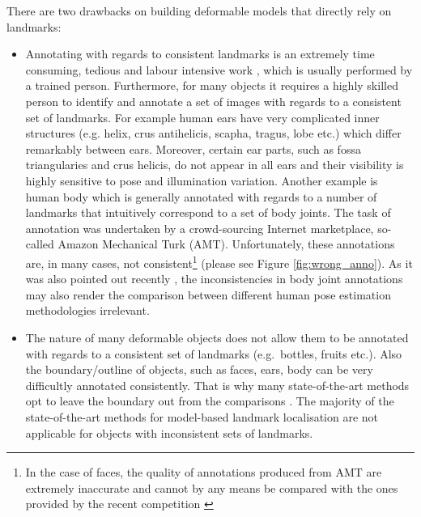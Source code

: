 There are two drawbacks on building deformable models that directly rely on landmarks:
\begin{itemize}

\item Annotating with regards to consistent landmarks is an extremely time consuming, tedious and labour intensive work \cite{sagonas_iccv_300w_2013}, which is usually performed by a trained person. Furthermore, for many objects it requires a highly skilled person to identify and annotate a set of images with regards to a consistent set of landmarks. For example human ears have very complicated inner structures (e.g. helix, crus antihelicis, scapha, tragus, lobe etc.) which differ remarkably between ears. Moreover, certain ear parts, such as  fossa triangularies and crus helicis, do not appear in all ears and  their visibility is highly sensitive to pose and illumination variation. Another example is human body which is generally annotated with regards to a number of landmarks that intuitively correspond to a set of body joints. The task of annotation was undertaken by a crowd-sourcing Internet marketplace, so-called Amazon Mechanical Turk (AMT). Unfortunately, these annotations are, in many cases, not consistent\footnote{In the case of faces, the quality of annotations produced from AMT are extremely inaccurate and cannot by any means be compared with the ones provided by the recent competition \cite{sagonas_iccv_300w_2013}} (please see Figure \ref{fig:wrong_anno}). As it was also pointed out recently \cite{tompson2015efficient}, the inconsistencies in body joint annotations may also render the comparison between different human pose estimation methodologies irrelevant.

\item The nature of many deformable objects does not allow them to be annotated with regards to a consistent set of landmarks (e.g.~bottles, fruits etc.). Also the boundary/outline of objects, such as faces, ears, body can be very difficultly annotated consistently. That is why many state-of-the-art methods opt to leave the boundary out from the comparisons \cite{Tzimiropoulos2014, Asthana2014}. The majority of the state-of-the-art methods for model-based landmark localisation \cite{Cao2012, Zhu2012, Xiong2013, Tzimiropoulos2014, Asthana2014} are not applicable for objects with inconsistent sets of landmarks.

\end{itemize}

